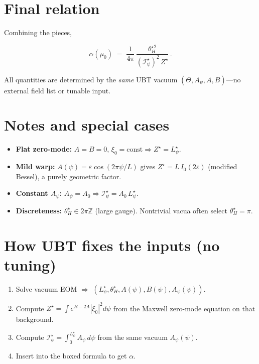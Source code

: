 \documentclass[11pt]{article}
\begin{document}
\section*{Final relation}
Combining the pieces,
\begin{tcolorbox}[colback=white,colframe=black,title={\normalsize Noether $\Rightarrow$ $\alpha$ (UBT-only)}]
\begin{equation*}
\boxed{\quad
\alpha(\mu_0) \;=\; \frac{1}{4\pi}\,\frac{\theta_H^{\star 2}}{(\mathcal I_\psi^\star)^2\,Z^\star}\,.
\quad}
\end{equation*}
\end{tcolorbox}
All quantities are determined by the \emph{same} UBT vacuum $(\Theta, A_\psi, A,B)$---no external field list or tunable input.

\section*{Notes and special cases}
\begin{itemize}
\item \textbf{Flat zero-mode:} $A=B=0$, $\xi_0=\text{const}\Rightarrow Z^\star=L_\psi^\star$.
\item \textbf{Mild warp:} $A(\psi)=\varepsilon\cos(2\pi\psi/L)$ gives $Z^\star=L\,I_0(2\varepsilon)$ (modified Bessel), a purely geometric factor.
\item \textbf{Constant $A_\psi$:} $A_\psi=A_0\Rightarrow \mathcal I_\psi^\star=A_0\,L_\psi^\star$.
\item \textbf{Discreteness:} $\theta_H^\star\in 2\pi\mathbb Z$ (large gauge). Nontrivial vacua often select $\theta_H^\star=\pi$.
\end{itemize}

\section*{How UBT fixes the inputs (no tuning)}
\begin{enumerate}
\item Solve vacuum EOM $\Rightarrow$ $(L_\psi^\star,\theta_H^\star,A(\psi),B(\psi),A_\psi(\psi))$.
\item Compute $Z^\star=\int e^{B-2A}|\xi_0|^2 d\psi$ from the Maxwell zero-mode equation on that background.
\item Compute $\mathcal I_\psi^\star=\int_0^{L_\psi^\star}A_\psi\,d\psi$ from the same vacuum $A_\psi(\psi)$.
\item Insert into the boxed formula to get $\alpha$.
\end{enumerate}
\end{document}
